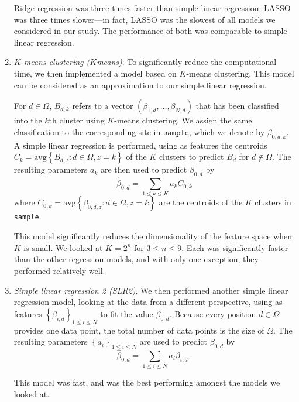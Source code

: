 \documentclass{article} %
\begin{document}
\begin{enumerate}
Ridge regression was three times faster than simple linear regression; LASSO was three times slower---in fact, LASSO was the slowest of all models we considered in our study. The performance of both was comparable to simple linear regression.

\item \emph{$K$-means clustering ($K$means)}. To significantly reduce the computational time, we then implemented a model based on $K$-means clustering. This model can be considered as an approximation to our simple linear regression.

For $d \in \Omega$, $B_{d,k}$ refers to a vector $ \left(\beta_{1,d},\dots,\beta_{N,d}\right)$ that has been classified into the $k$th cluster using $K$-means clustering. We assign the same classification to the corresponding site in $\texttt{sample}$, which we denote by $\beta_{0,d,k}$. A simple linear regression is performed, using as features the centroids $C_k = \text{avg}\left\{B_{d,z} : d \in \Omega, z = k\right\}$ of the $K$ clusters to predict $B_{d}$ for $d \notin \Omega$. The resulting parameters $a_k$ are then used to predict $\beta_{0,d}$ by
\[ \hat{\beta}_{0,d} = \sum_{1 \leq k \leq K} a_k C_{0,k}\]
where $C_{0,k} = \text{avg}\left\{\beta_{0,d,z} : d \in \Omega, z = k\right\}$ are the centroids of the $K$ clusters in \texttt{sample}.

This model significantly reduces the dimensionality of the feature space when $K$ is small. We looked at $K = 2^n$ for $3 \leq n \leq 9$. Each was significantly faster than the other regression models, and with only one exception, they performed relatively well.

\item \emph{Simple linear regression 2 (SLR2)}. We then performed another simple linear regression model, looking at the data from a different perspective, using as features $\left\{ \beta_{i,d} \right\}_{1\leq i \leq N}$ to fit the value $\beta_{0,d}$. Because every position $d \in \Omega$ provides one data point, the total number of data points is the size of $\Omega$. The resulting parameters $\left\{ a_{i}\right\}_{1\leq i \leq N}$ are used to predict $\beta_{0,d}$ by
\begin{equation} \label{beta.samples} \hat{\beta}_{0,d} = \sum_{1 \leq i \leq N} a_i \beta_{i,d} \ .\end{equation}

This model was fast, and was the best performing amongst the models we looked at.

\end{enumerate}
\end{document}

